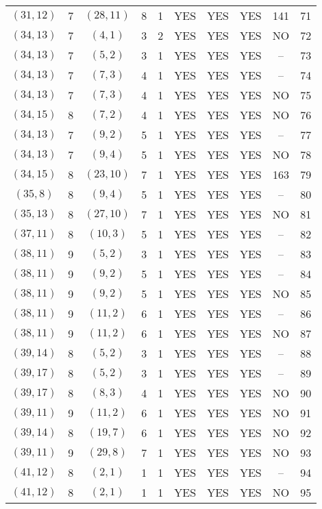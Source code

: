 \begin{longtable}{|c|c|c|c|c|c|c|c|c|c|}
$(31, 12)$ & 7 & $(28, 11)$ & 8 & 1 & YES & YES & YES & 141 & 71\\
$(34, 13)$ & 7 & $(4, 1)$ & 3 & 2 & YES & YES & YES & NO & 72\\
$(34, 13)$ & 7 & $(5, 2)$ & 3 & 1 & YES & YES & YES & -- & 73\\
$(34, 13)$ & 7 & $(7, 3)$ & 4 & 1 & YES & YES & YES & -- & 74\\
$(34, 13)$ & 7 & $(7, 3)$ & 4 & 1 & YES & YES & YES & NO & 75\\
$(34, 15)$ & 8 & $(7, 2)$ & 4 & 1 & YES & YES & YES & NO & 76\\
$(34, 13)$ & 7 & $(9, 2)$ & 5 & 1 & YES & YES & YES & -- & 77\\
$(34, 13)$ & 7 & $(9, 4)$ & 5 & 1 & YES & YES & YES & NO & 78\\
$(34, 15)$ & 8 & $(23, 10)$ & 7 & 1 & YES & YES & YES & 163 & 79\\
$(35, 8)$ & 8 & $(9, 4)$ & 5 & 1 & YES & YES & YES & -- & 80\\
$(35, 13)$ & 8 & $(27, 10)$ & 7 & 1 & YES & YES & YES & NO & 81\\
$(37, 11)$ & 8 & $(10, 3)$ & 5 & 1 & YES & YES & YES & -- & 82\\
$(38, 11)$ & 9 & $(5, 2)$ & 3 & 1 & YES & YES & YES & -- & 83\\
$(38, 11)$ & 9 & $(9, 2)$ & 5 & 1 & YES & YES & YES & -- & 84\\
$(38, 11)$ & 9 & $(9, 2)$ & 5 & 1 & YES & YES & YES & NO & 85\\
$(38, 11)$ & 9 & $(11, 2)$ & 6 & 1 & YES & YES & YES & -- & 86\\
$(38, 11)$ & 9 & $(11, 2)$ & 6 & 1 & YES & YES & YES & NO & 87\\
$(39, 14)$ & 8 & $(5, 2)$ & 3 & 1 & YES & YES & YES & -- & 88\\
$(39, 17)$ & 8 & $(5, 2)$ & 3 & 1 & YES & YES & YES & -- & 89\\
$(39, 17)$ & 8 & $(8, 3)$ & 4 & 1 & YES & YES & YES & NO & 90\\
$(39, 11)$ & 9 & $(11, 2)$ & 6 & 1 & YES & YES & YES & NO & 91\\
$(39, 14)$ & 8 & $(19, 7)$ & 6 & 1 & YES & YES & YES & NO & 92\\
$(39, 11)$ & 9 & $(29, 8)$ & 7 & 1 & YES & YES & YES & NO & 93\\
$(41, 12)$ & 8 & $(2, 1)$ & 1 & 1 & YES & YES & YES & -- & 94\\
$(41, 12)$ & 8 & $(2, 1)$ & 1 & 1 & YES & YES & YES & NO & 95\\

\end{longtable}
